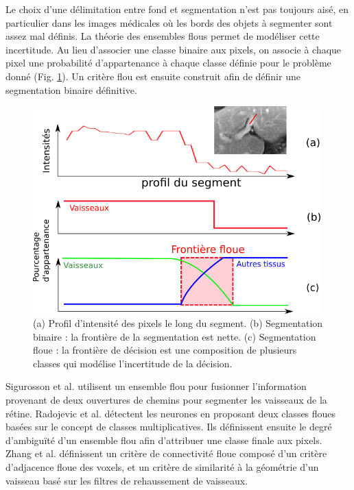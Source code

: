       Le choix d'une délimitation entre fond et segmentation n'est pas toujours aisé, en particulier dans les images médicales où les bords des objets à segmenter sont assez mal définis. La théorie des ensembles flous permet de modéliser cette incertitude. Au lieu d'associer une classe binaire aux pixels, on associe à chaque pixel une probabilité d'appartenance à chaque classe définie pour le problème donné (Fig. \ref{fig:fuzzy_segmentation}). Un critère flou est ensuite construit afin de définir une segmentation binaire définitive.

      \begin{figure}[h]
        \centering
        \includegraphics[height=8cm]{Images/fuzzy_segmentation.png}
        \caption{(a) Profil d'intensité des pixels le long du segment. (b) Segmentation binaire : la frontière de la segmentation est nette. (c) Segmentation floue : la frontière de décision est une composition de plusieurs classes qui modélise l'incertitude de la décision.}
        \label{fig:fuzzy_segmentation}
      \end{figure}

      Sigurosson et al. \cite{Sigurosson2014_retinal_morpho_fuzzy} utilisent un ensemble flou pour fusionner l'information provenant de deux ouvertures de chemins pour segmenter les vaisseaux de la rétine. 
      Radojevic et al. \cite{Radojevic2015_fuzzy_logic} détectent les neurones en proposant deux classes floues basées sur le concept de classes multiplicatives. Ils définissent ensuite le degré d'ambiguïté d'un ensemble flou afin d'attribuer une classe finale aux pixels.
      Zhang et al. \cite{Zhang2018_liver_fuzzy_connectedness} définissent un critère de connectivité floue composé d'un critère d'adjacence floue des voxels, et un critère de similarité à la géométrie d'un vaisseau basé sur les filtres de rehaussement de vaisseaux.  

